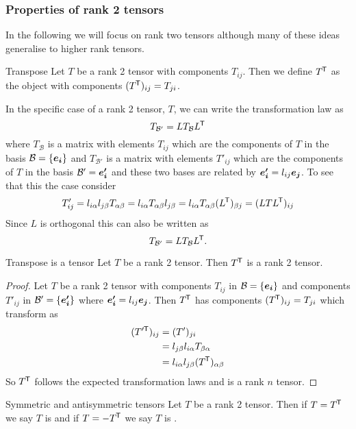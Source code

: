 \documentclass[a4paper]{article}
\newcommand{\basis}{\mathcal{B}}
\newcommand{\veprime}[1]{\vv{e'_{#1}}}
\begin{document}
    \subsubsection{Properties of rank 2 tensors}
    In the following we will focus on rank two tensors although many of these ideas generalise to higher rank tensors.
    \begin{definition}{Transpose}{}
        Let \(T\) be a rank 2 tensor with components \(T_{ij}\).
        Then we define \(T^{\mkern-1.5mu\mathsf{T}}\) as the object with components \((T^{\mkern-1.5mu\mathsf{T}})_{ij} = T_{ji}\).
    \end{definition}
    In the specific case of a rank 2 tensor, \(T\), we can write the transformation law as
    \[T_{\basis'} = LT_{\basis}L\trans\]
    where \(T_{\basis}\) is a matrix with elements \(T_{ij}\) which are the components of \(T\) in the basis \(\basis = \{\ve{i}\}\) and \(T_{\basis'}\) is a matrix with elements \(T'_{ij}\) which are the components of \(T\) in the basis \(\basis' = \veprime{i}\) and these two bases are related by \(\veprime{i} = l_{ij}\ve{j}\).
    To see that this the case consider
    \[T'_{ij} = l_{i\alpha}l_{j\beta}T_{\alpha\beta} = l_{i\alpha}T_{\alpha\beta}l_{j\beta} = l_{i\alpha}T_{\alpha\beta}(L^{\mkern-1.5mu\mathsf{T}})_{\beta j} = (LTL^{\mkern-1.5mu\mathsf{T}})_{ij}\]
    Since \(L\) is orthogonal this can also be written as
    \[T_{\basis'} = LT_{\basis}L\trans.\]
    \begin{lemma}{Transpose is a tensor}{}
        Let \(T\) be a rank 2 tensor.
        Then \(T^{\mkern-1.5mu\mathsf{T}}\) is a rank 2 tensor.
    \end{lemma}
    \begin{proof}
        Let \(T\) be a rank 2 tensor with components \(T_{ij}\) in \(\basis = \{\ve{i}\}\) and components \(T'_{ij}\) in \(\basis' = \{\veprime{i}\}\) where \(\veprime{i} = l_{ij}\ve{j}\).
        Then \(T^{\mkern-1.5mu\mathsf{T}}\) has components \((T^{\mkern-1.5mu\mathsf{T}})_{ij} = T_{ji}\) which transform as
        \begin{align*}
            ({T'}{^{\mkern-1.5mu\mathsf{T}}})_{ij} &= (T')_{ji}\\
            &= l_{j\beta}l_{i\alpha}T_{\beta\alpha}\\
            &= l_{i\alpha}l_{j\beta}(T^{\mkern-1.5mu\mathsf{T}})_{\alpha\beta}
        \end{align*}
        So \(T^{\mkern-1.5mu\mathsf{T}}\) follows the expected transformation laws and is a rank \(n\) tensor.
    \end{proof}
    \begin{definition}{Symmetric and antisymmetric tensors}{}
        Let \(T\) be a rank 2 tensor.
        Then if \(T = T^{\mkern-1.5mu\mathsf{T}}\) we say \(T\) is  and if \(T = -T^{\mkern-1.5mu\mathsf{T}}\) we say \(T\) is .
    \end{definition}
\end{document}
